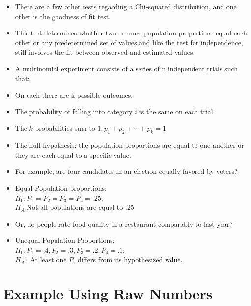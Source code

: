 \documentclass[
  letterpaper,
  DIV=11,
  numbers=noendperiod]{scrreprt}
\begin{document}
\begin{itemize}
\item
  There are a few other tests regarding a Chi-squared distribution, and
  one other is the goodness of fit test.
\item
  This test determines whether two or more population proportions equal
  each other or any predetermined set of values and like the test for
  independence, still involves the fit between observed and estimated
  values.
\item
  A multinomial experiment consists of a series of n independent trials
  such that:
\item
  On each there are k possible outcomes.
\item
  The probability of falling into category \(i\) is the same on each
  trial.
\item
  The \(k\) probabilities sum to \(1:p_1 + p_2 +⋯+p_k = 1\)
\item
  The null hypothesis: the population proportions are equal to one
  another or they are each equal to a specific value.
\item
  For example, are four candidates in an election equally favored by
  voters?
\item
  Equal Population proportions:\\
  \(H_0: P_1=P_2=P_3=P_4=.25;\)\\
  \(H_A\):Not all populations are equal to .25
\item
  Or, do people rate food quality in a restaurant comparably to last
  year?
\item
  Unequal Population Proportions:\\
  \(H_0: P_1= .4, P_2=.3, P_3= .2, P_4=.1;\)\\
  \(H_A:\) At least one \(P_i\) differs from its hypothesized value.
\end{itemize}

\section{Example Using Raw Numbers}\label{example-using-raw-numbers}
\end{document}
